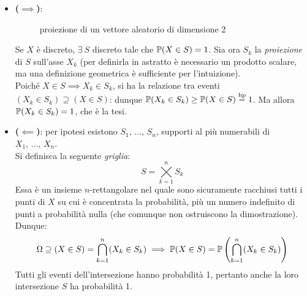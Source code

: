 \begin{dimo}
  \Fixvmode
  \begin{itemize}
    \item \textbf{($\implies$)}:
    \begin{figure}[h]
      \centering
      \caption{proiezione di un vettore aleatorio di dimensione 2}
    \end{figure}

    Se $X$ è discreto, $\exists \ S$ discreto tale che $\mathbb P (X \in S) = 1$. Sia ora $S_k$ la \emph{proiezione} di $S$ sull'asse $X_k$ (per definirla in astratto è necessario un prodotto scalare, ma una definizione geometrica è sufficiente per l'intuizione). \\
    Poiché $X \in S \implies X_k \in S_k$, si ha la relazione tra eventi $(X_k \in S_k) \supseteq (X \in S)$: dunque
    $\mathbb P(X_k \in S_k) \geq \mathbb P(X \in S) \stackrel{\text{hp}}{=} 1$. Ma allora $\mathbb P(X_k \in S_k) = 1$, che è la tesi. \\

    \item \textbf{($\impliedby$)}:
    per ipotesi esistono $S_1, \, \dots, \, S_n$, supporti al più numerabili di $X_1, \, \dots, \, X_n$. \\
    Si definisca la seguente \emph{griglia}:
    $$S = \bigtimes\limits_{k=1}^n S_k$$
    Essa è un insieme $n$-rettangolare nel quale sono sicuramente racchiusi tutti i punti di $X$ su cui è concentrata la probabilità, più un numero indefinito di punti a probabilità nulla (che comunque non ostruiscono la dimostrazione). Dunque:
    $$ \Omega \supseteq (X \in S) = \bigcap_{k=1}^n (X_k \in S_k) \implies
    \mathbb P(X \in S) = \mathbb P \left( \bigcap_{k=1}^n (X_k \in S_k) \right)$$
    Tutti gli eventi dell'intersezione hanno probabilità 1, pertanto anche la loro intersezione $S$ ha probabilità 1. \qedhere
  \end{itemize}
\end{dimo}

